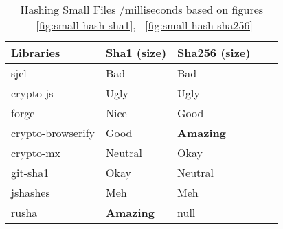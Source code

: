 \begin{table}[htpb]
\centering
\caption{Hashing Small Files /milliseconds based on figures ~\ref{fig:small-hash-sha1}, ~\ref{fig:small-hash-sha256}}
\label{tab:hashing-small-files}
\begin{adjustbox}{center, width=\columnwidth-20pt}
\begin{tabular}{|l|l|l|l|l|}
\hline
Libraries & Sha1 (size) & Sha256 (size) \\ \hline
sjcl				& Bad	& Bad		\\ \hline
crypto-js			& Ugly	& Ugly		\\ \hline
forge				& Nice	& Good		\\ \hline
crypto-browserify	& Good	& \textbf{Amazing}	\\ \hline
crypto-mx           & Neutral	& Okay			\\ \hline
git-sha1            & Okay		& Neutral		\\ \hline
jshashes            & Meh		& Meh			\\ \hline
rusha               & \textbf{Amazing}	& null	\\ \hline
\end{tabular}
\end{adjustbox}
\end{table}


